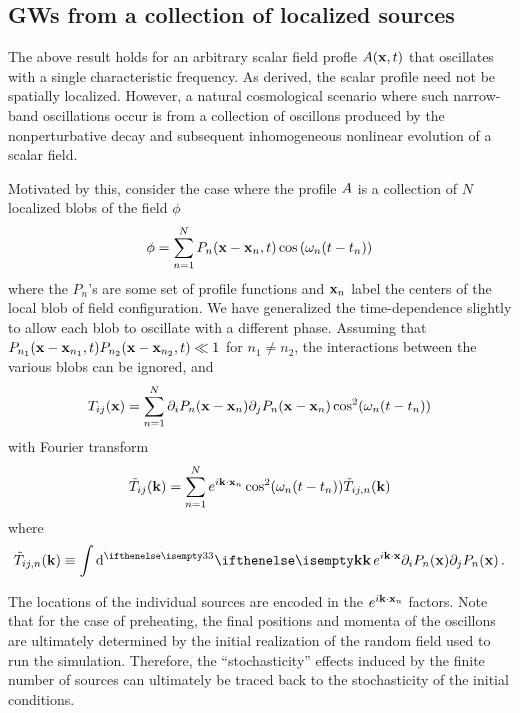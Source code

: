 \documentclass{revtex4}
\begin{document}
\subsection{GWs from a collection of localized sources}
The above result holds for an arbitrary scalar field profle $A({\bf x},t)$ that oscillates with a single characteristic frequency.
As derived, the scalar profile need not be spatially localized.
However, a natural cosmological scenario where such narrow-band oscillations occur is from a collection of oscillons produced by the nonperturbative decay and subsequent inhomogeneous nonlinear evolution of a scalar field.

Motivated by this, consider the case where the profile $A$ is a collection of $N$ localized blobs of the field $\phi$
\begin{equation}
  \phi = \sum_{n=1}^{N} P_n({\bf x-x}_n,t)\cos\left(\omega_n(t-t_n)\right)
\end{equation}
where the $P_n$'s are some set of profile functions and ${\bf x}_n$ label the centers of the local blob of field configuration.
We have generalized the time-dependence slightly to allow each blob to oscillate with a different phase.
Assuming that $P_{n_1}({\bf x-x}_{n_1},t)P_{n_{2}}({\bf x - x}_{n_2},t) \ll 1$ for $n_1 \neq n_2$, the interactions between the various blobs can be ignored, and
\begin{equation}
  T_{ij}({\bf x}) = \sum_{n=1}^N\partial_iP_n({\bf x-x}_n)\partial_jP_n({\bf x-x}_n)\cos^2(\omega_n(t-t_n))
\end{equation}
with Fourier transform
\begin{equation}
  \tilde{T}_{ij}({\bf k}) = \sum_{n=1}^Ne^{i{\bf k}\cdot{\bf x}_n}\cos^2(\omega_n(t-t_n))\tilde{T}_{ij,n}({\bf k})
\end{equation}
where
\begin{equation}
  \tilde{T}_{ij,n}(\kvec) \equiv \int \ud[3]{\kvec}e^{i\kvec\cdot\xvec}\partial_iP_n(\xvec)\partial_jP_n(\xvec) \, .
\end{equation}

The locations of the individual sources are encoded in the $e^{i{\bf k}\cdot{\bf x}_n}$ factors.
Note that for the case of preheating, the final positions and momenta of the oscillons are ultimately determined by the initial realization of the random field used to run the simulation.
Therefore, the ``stochasticity'' effects induced by the finite number of sources can ultimately be traced back to the stochasticity of the initial conditions.
\end{document}
